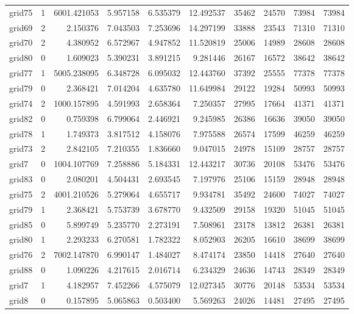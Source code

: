 \begin{longtable}{|l|r|r|r|r|r|r|r|r|r|}
grid75 & 1 & 6001.421053 & 5.957158 & 6.535379 & 12.492537 & 35462 & 24570 & 73984 & 73984 \\
grid69 & 2 & 2.150376 & 7.043503 & 7.253696 & 14.297199 & 33888 & 23543 & 71310 & 71310 \\
grid70 & 2 & 4.380952 & 6.572967 & 4.947852 & 11.520819 & 25006 & 14989 & 28608 & 28608 \\
grid80 & 0 & 1.609023 & 5.390231 & 3.891215 & 9.281446 & 26167 & 16572 & 38642 & 38642 \\
grid77 & 1 & 5005.238095 & 6.348728 & 6.095032 & 12.443760 & 37392 & 25555 & 77378 & 77378 \\
grid79 & 0 & 2.368421 & 7.014204 & 4.635780 & 11.649984 & 29122 & 19284 & 50993 & 50993 \\
grid74 & 2 & 1000.157895 & 4.591993 & 2.658364 & 7.250357 & 27995 & 17664 & 41371 & 41371 \\
grid82 & 0 & 0.759398 & 6.799064 & 2.446921 & 9.245985 & 26386 & 16636 & 39050 & 39050 \\
grid78 & 1 & 1.749373 & 3.817512 & 4.158076 & 7.975588 & 26574 & 17599 & 46259 & 46259 \\
grid73 & 2 & 2.842105 & 7.210355 & 1.836660 & 9.047015 & 24978 & 15109 & 28757 & 28757 \\
grid7 & 0 & 1004.107769 & 7.258886 & 5.184331 & 12.443217 & 30736 & 20108 & 53476 & 53476 \\
grid83 & 0 & 2.080201 & 4.504431 & 2.693545 & 7.197976 & 25106 & 15159 & 28948 & 28948 \\
grid75 & 2 & 4001.210526 & 5.279064 & 4.655717 & 9.934781 & 35492 & 24600 & 74027 & 74027 \\
grid79 & 1 & 2.368421 & 5.753739 & 3.678770 & 9.432509 & 29158 & 19320 & 51045 & 51045 \\
grid85 & 0 & 5.899749 & 5.235770 & 2.273191 & 7.508961 & 23178 & 13812 & 26381 & 26381 \\
grid80 & 1 & 2.293233 & 6.270581 & 1.782322 & 8.052903 & 26205 & 16610 & 38699 & 38699 \\
grid76 & 2 & 7002.147870 & 6.990147 & 1.484027 & 8.474174 & 23850 & 14418 & 27640 & 27640 \\
grid88 & 0 & 1.090226 & 4.217615 & 2.016714 & 6.234329 & 24636 & 14743 & 28349 & 28349 \\
grid7 & 1 & 4.182957 & 7.452266 & 4.575079 & 12.027345 & 30776 & 20148 & 53534 & 53534 \\
grid8 & 0 & 0.157895 & 5.065863 & 0.503400 & 5.569263 & 24026 & 14481 & 27495 & 27495 \\

\end{longtable}
